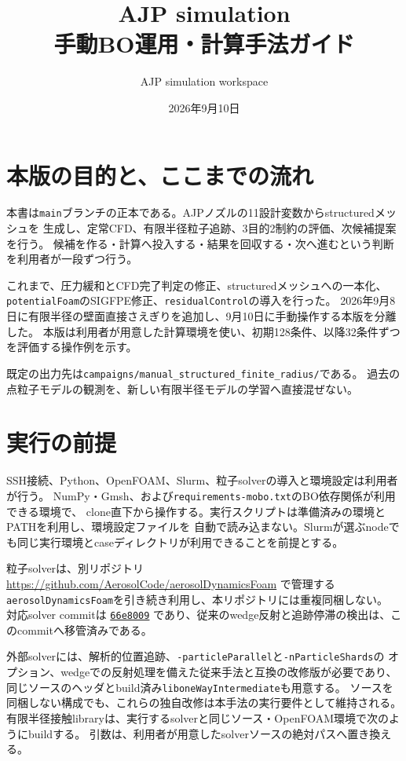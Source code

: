 \documentclass[a4paper,11pt]{article}
\title{AJP simulation\\手動BO運用・計算手法ガイド}
\author{AJP simulation workspace}
\date{2026年9月10日}
\newcommand{\code}[1]{\texttt{#1}}
\begin{document}
\maketitle

\section{本版の目的と、ここまでの流れ}

本書は\code{main}ブランチの正本である。AJPノズルの11設計変数からstructuredメッシュを
生成し、定常CFD、有限半径粒子追跡、3目的2制約の評価、次候補提案を行う。
候補を作る・計算へ投入する・結果を回収する・次へ進むという判断を利用者が一段ずつ行う。

これまで、圧力緩和とCFD完了判定の修正、structuredメッシュへの一本化、
\code{potentialFoam}のSIGFPE修正、\code{residualControl}の導入を行った。
2026年9月8日に有限半径の壁面直接さえぎりを追加し、9月10日に手動操作する本版を分離した。
本版は利用者が用意した計算環境を使い、初期128条件、以降32条件ずつを評価する操作例を示す。

既定の出力先は\nolinkurl{campaigns/manual_structured_finite_radius/}である。
過去の点粒子モデルの観測を、新しい有限半径モデルの学習へ直接混ぜない。

\section{実行の前提}

SSH接続、Python、OpenFOAM、Slurm、粒子solverの導入と環境設定は利用者が行う。
NumPy・Gmsh、および\code{requirements-mobo.txt}のBO依存関係が利用できる環境で、
clone直下から操作する。実行スクリプトは準備済みの環境とPATHを利用し、環境設定ファイルを
自動で読み込まない。Slurmが選ぶnodeでも同じ実行環境とcaseディレクトリが利用できることを前提とする。

粒子solverは、別リポジトリ
\url{https://github.com/AerosolCode/aerosolDynamicsFoam}
で管理する\code{aerosolDynamicsFoam}を引き続き利用し、本リポジトリには重複同梱しない。
対応solver commitは
\href{https://github.com/AerosolCode/aerosolDynamicsFoam/commit/66e8009bbc423ff2076bb8bd3110a58affa56142}{\code{66e8009}}
であり、従来のwedge反射と追跡停滞の検出は、このcommitへ移管済みである。

外部solverには、解析的位置追跡、\code{-particleParallel}と\code{-nParticleShards}の
オプション、wedgeでの反射処理を備えた従来手法と互換の改修版が必要であり、
同じソースのヘッダとbuild済み\code{liboneWayIntermediate}も用意する。
ソースを同梱しない構成でも、これらの独自改修は本手法の実行要件として維持される。
有限半径接触libraryは、実行するsolverと同じソース・OpenFOAM環境で次のようにbuildする。
引数は、利用者が用意したsolverソースの絶対パスへ置き換える。
\end{document}
